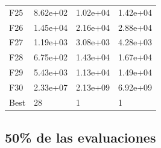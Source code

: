 \begin{table}[H]
\begin{minipage}{.5\linewidth}
\begin{tabular}{llll}
        F25  &   8.62e+02 &   1.02e+04 &  1.42e+04 \\
        F26  &   1.45e+04 &   2.16e+04 &  2.88e+04 \\
        F27  &   1.19e+03 &   3.08e+03 &  4.28e+03 \\
        F28  &   6.75e+02 &   1.43e+04 &  1.67e+04 \\
        F29  &   5.43e+03 &   1.13e+04 &  1.49e+04 \\
        F30  &   2.33e+07 &   2.13e+09 &  6.92e+09 \\
        Best &         28 &          1 &         1 \\
        \bottomrule
        \end{tabular}
        
    \end{minipage} 
\end{table}


\subsection*{50\% de las evaluaciones}

